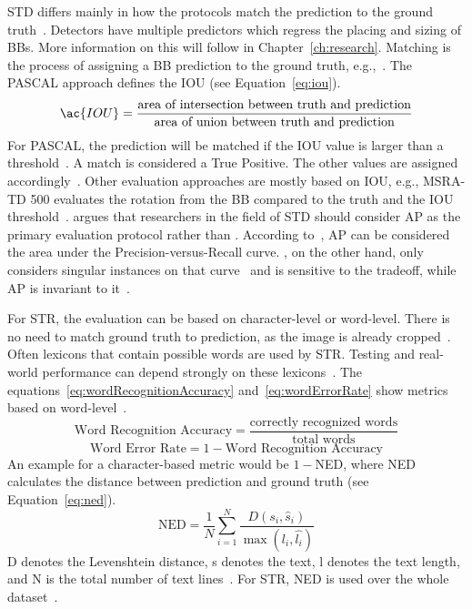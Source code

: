 \ac{STD} differs mainly in how the protocols match the prediction to the ground
truth~\citep{long_scene_2021}.
Detectors have multiple predictors which regress the placing and sizing of \acp{BB}.
More information on this will follow in Chapter~\ref{ch:research}.
Matching is the process of assigning a \ac{BB} prediction to the ground
truth, e.g.,~\cite{liu_ssd_2016,liao_textboxes_2018}.
The PASCAL approach defines the \ac{IOU} (see Equation~\ref{eq:iou}).
\begin{equation}\label{eq:iou}
    \ac{IOU}=
            \frac{\text{area of intersection between truth and prediction}}{\text{area of union
            between truth and prediction}}
\end{equation}
For PASCAL, the prediction will be matched if the \ac{IOU} value is larger than a
threshold~\citep{long_scene_2021}.
A match is considered a True Positive.
The other values are assigned accordingly~\citep{sun_icdar_2019}.
Other evaluation approaches are mostly based on \ac{IOU}, e.g., MSRA-TD 500 evaluates the rotation
from the \ac{BB} compared to the truth and the \ac{IOU}
threshold~\citep{long_scene_2021}.
\cite{long_scene_2021} argues that researchers in the field of \ac{STD} should consider \ac{AP}
as the primary evaluation protocol rather than \fone.
According to~\cite{su_relationship_2015}, \ac{AP} can be considered the area under the
Precision-versus-Recall curve.
\fone, on the other hand, only considers singular instances on that curve~\citep{long_scene_2021} and
is sensitive to the tradeoff, while \ac{AP} is invariant to it~\citep{shi_icdar2017_2017}.

For \ac{STR}, the evaluation can be based on character-level or word-level.
There is no need to match ground truth to prediction, as the image is already
cropped~\citep{long_scene_2021}.
Often lexicons that contain possible words are used by \ac{STR}.
Testing and real-world performance can depend strongly on these
lexicons~\citep{chen_text_2021,long_scene_2021}.
The equations~\ref{eq:wordRecognitionAccuracy} and~\ref{eq:wordErrorRate} show metrics based on
word-level~\citep{chen_text_2021}.
\begin{equation}\label{eq:wordRecognitionAccuracy}
\text{Word Recognition Accuracy} = \frac{\text{correctly recognized words}}{\text{total words}}
\end{equation}
\begin{equation}\label{eq:wordErrorRate}
    \text{Word Error Rate} = 1 - \text{Word Recognition Accuracy}
\end{equation}
An example for a character-based metric would be $1 - $NED, where \ac{NED}
calculates the distance between prediction and ground truth (see Equation~\ref{eq:ned}).
\begin{equation}\label{eq:ned}
    \text{NED} = \frac{1}{N}\sum_{i=1}^N \frac{D(s_i,\hat{s}_i)}{\max(l_i,\hat{l_i})}
\end{equation}
D denotes the Levenshtein distance, s denotes the text, l denotes the text length, and N is the total
number of text lines~\citep{shi_icdar2017_2017}.
For \ac{STR}, \ac{NED} is used over the whole dataset~\citep{karatzas_icdar_2013}.

